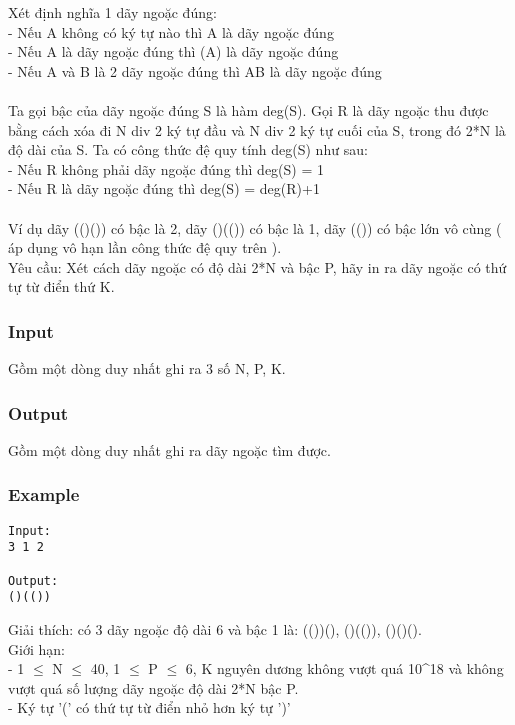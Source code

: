 



   Xét định nghĩa 1 dãy ngoặc đúng:   
\\   - Nếu A không có ký tự nào thì A là dãy ngoặc đúng   
\\   - Nếu A là dãy ngoặc đúng thì (A) là dãy ngoặc đúng   
\\   - Nếu A và B là 2 dãy ngoặc đúng thì AB là dãy ngoặc đúng   
\\
\\   Ta gọi bậc của dãy ngoặc đúng S là hàm deg(S). Gọi R là dãy ngoặc thu được bằng cách xóa đi N div 2 ký tự đầu và N div 2 ký tự cuối của S, trong đó 2*N là độ dài của S. Ta có công thức đệ quy tính deg(S) như sau:   
\\   - Nếu R không phải dãy ngoặc đúng thì deg(S) = 1   
\\   - Nếu R là dãy ngoặc đúng thì deg(S) = deg(R)+1   
\\
\\   Ví dụ dãy (()()) có bậc là 2, dãy ()(()) có bậc là 1, dãy (()) có bậc lớn vô cùng ( áp dụng vô hạn lần công thức đệ quy trên ).   
\\   Yêu cầu: Xét cách dãy ngoặc có độ dài 2*N và bậc P, hãy in ra dãy ngoặc có thứ tự từ điển thứ K.  

\subsubsection{   Input  }

   Gồm một dòng duy nhất ghi ra 3 số N, P, K.  

\subsubsection{   Output  }

   Gồm một dòng duy nhất ghi ra dãy ngoặc tìm được.  

\subsubsection{   Example  }
\begin{verbatim}
Input:
3 1 2

Output:
()(())
\end{verbatim}

   Giải thích: có 3 dãy ngoặc độ dài 6 và bậc 1 là: (())(), ()(()), ()()().   
\\   Giới hạn:   
\\   - 1  $\le$  N  $\le$  40, 1  $\le$  P  $\le$  6, K nguyên dương không vượt quá 10^18 và không vượt quá số lượng dãy ngoặc độ dài 2*N bậc P.   
\\   - Ký tự '(' có thứ tự từ điển nhỏ hơn ký tự ')'  
